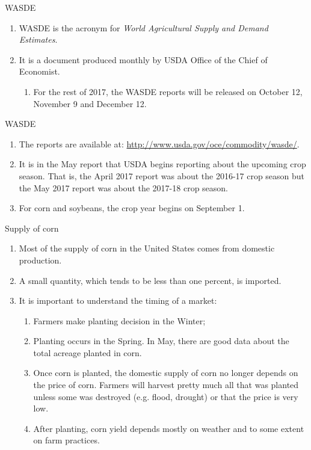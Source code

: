 \documentclass[table,xcolor=pdftex,dvipsnames, handout]{beamer}\usepackage[]{graphicx}\usepackage[]{color}
\begin{document}
\begin{frame}{WASDE}
\begin{enumerate}[label=\textbullet]
  \item WASDE is the acronym for \emph{World Agricultural Supply and Demand Estimates}.
  \item It is a document produced monthly by USDA Office of the Chief of Economist.
      \begin{enumerate}[label=-]
         \item For the rest of 2017, the WASDE reports will be released on October 12, November 9 and December 12.
      \end{enumerate}
\end{enumerate}
\end{frame}


\begin{frame}{WASDE}
\begin{enumerate}[label=\textbullet]
  \item The reports are available at: \url{http://www.usda.gov/oce/commodity/wasde/}.
  \item It is in the May report that USDA begins reporting about the upcoming crop season. That is, the April 2017 report was about the 2016-17 crop season but the May 2017 report was about the 2017-18 crop season.
  \item For corn and soybeans, the crop year begins on September 1.
\end{enumerate}
\end{frame}


\begin{frame}{Supply of corn}
\begin{enumerate}[label=\textbullet]
  \item Most of the supply of corn in the United States comes from domestic production.
  \item A small quantity, which tends to be less than one percent, is imported.
  \item It is important to understand the timing of a market:
    \begin{enumerate}[label=-]
         \item Farmers make planting decision in the Winter;
         \item Planting occurs in the Spring. In May, there are good data about the total acreage planted in corn.
         \item Once corn is planted, the domestic supply of corn no longer depends on the price of corn. Farmers will harvest pretty much all that was planted unless some was destroyed (e.g. flood, drought) or that the price is very low.
         \item After planting, corn yield depends mostly on weather and to some extent on farm practices.
    \end{enumerate}
\end{enumerate}
\end{frame}
\end{document}

